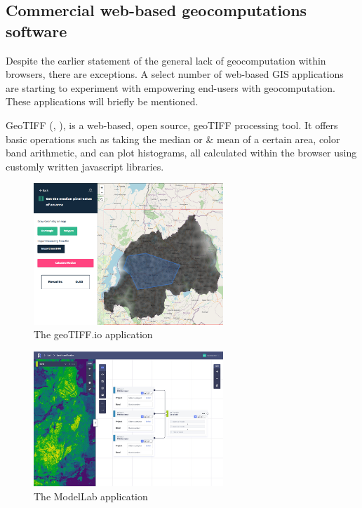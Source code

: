 \subsection{Commercial web-based geocomputations software}

Despite the earlier statement of the general lack of \ac{geocomputation} within browsers, there are exceptions. 
A select number of web-based \ac{GIS} applications are starting to experiment with empowering end-users with geocomputation. 
These applications will briefly be mentioned.
 
GeoTIFF (\citep{dufour_geotiffio_2022}, ), is a web-based, open source, geoTIFF processing tool. 
It offers basic operations such as taking the median or \& mean of a certain area, color band arithmetic, and can plot histograms, all calculated within the browser using customly written javascript libraries.

\begin{figure}
  \centering
  \graphicspath{ {../../assets/images/background/geo-web/} }
  \includegraphics[width=270px]{geotiff.png}
  \caption{The geoTIFF.io application \citep{dufour_geotiffio_2022}}
  \label{fig:geotiff}
\end{figure}

\begin{figure}
  \centering
  \graphicspath{ {../../assets/images/background/geo-web/} }
  \includegraphics[width=270px]{rasterfoundry-2.jpg}
  \caption{The ModelLab application \citep{azavea_geotrellis_2022}}
  \label{fig:modellab}
\end{figure}


